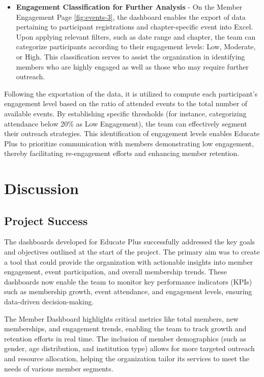 \documentclass[11pt,a4paper,]{article}
\providecommand{\tightlist}{%
  \setlength{\itemsep}{0pt}\setlength{\parskip}{0pt}}
\begin{document}
\begin{itemize}
\tightlist
\item
  \textbf{Engagement Classification for Further Analysis} - On the Member Engagement Page \ref{fig:events-3}, the dashboard enables the export of data pertaining to participant registrations and chapter-specific event into Excel. Upon applying relevant filters, such as date range and chapter, the team can categorize participants according to their engagement levels: Low, Moderate, or High. This classification serves to assist the organization in identifying members who are highly engaged as well as those who may require further outreach.
\end{itemize}

Following the exportation of the data, it is utilized to compute each participant's engagement level based on the ratio of attended events to the total number of available events. By establishing specific thresholds (for instance, categorizing attendance below 20\% as Low Engagement), the team can effectively segment their outreach strategies. This identification of engagement levels enables Educate Plus to prioritize communication with members demonstrating low engagement, thereby facilitating re-engagement efforts and enhancing member retention.

\section{Discussion}\label{discussion}

\subsection{Project Success}\label{project-success}

The dashboards developed for Educate Plus successfully addressed the key goals and objectives outlined at the start of the project. The primary aim was to create a tool that could provide the organization with actionable insights into member engagement, event participation, and overall membership trends. These dashboards now enable the team to monitor key performance indicators (KPIs) such as membership growth, event attendance, and engagement levels, ensuring data-driven decision-making.

The Member Dashboard highlights critical metrics like total members, new memberships, and engagement trends, enabling the team to track growth and retention efforts in real time. The inclusion of member demographics (such as gender, age distribution, and institution type) allows for more targeted outreach and resource allocation, helping the organization tailor its services to meet the needs of various member segments.
\end{document}
